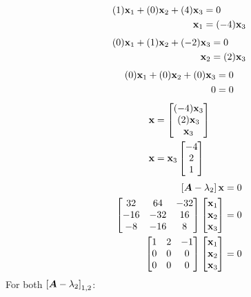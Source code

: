 \documentclass{article}
\begin{document}
\begin{align*}
	(1)\vect{x}_1 + (0)\vect{x}_2 + (4)\vect{x}_3 & = 0 \\
	\vect{x}_1 & = (-4)\vect{x}_3
\end{align*}
\begin{align*}
	(0)\vect{x}_1 + (1)\vect{x}_2 + (-2)\vect{x}_3 & = 0 \\
	\vect{x}_2 & = (2)\vect{x}_3
\end{align*}
\begin{align*}
	(0)\vect{x}_1 + (0)\vect{x}_2 + (0)\vect{x}_3 & = 0 \\
	0 & = 0
\end{align*}
\begin{align*}
	\vect{x} & = \begin{bmatrix} (-4)\vect{x}_3 \\ (2)\vect{x}_3 \\ \vect{x}_3 \end{bmatrix} \\
	\vect{x} & = \vect{x}_3 \begin{bmatrix} -4 \\ 2 \\ 1 \end{bmatrix}
\end{align*}
\begin{align*}
	\left[ \matr{A} - \lambda_2 \right] \vect{x} & =  0 \\
	\begin{bmatrix}
		32 & 64 & -32 \\
		-16 & -32 & 16 \\
		-8 & -16 & 8
	\end{bmatrix}
	\begin{bmatrix} \vect{x}_1 \\ \vect{x}_2 \\ \vect{x}_3 \end{bmatrix} & = 0 \\
	\begin{bmatrix}
		1 & 2 & -1 \\
		0 & 0 &  0 \\
		0 & 0 & 0
	\end{bmatrix}
	\begin{bmatrix} \vect{x}_1 \\ \vect{x}_2 \\ \vect{x}_3 \end{bmatrix} & = 0 \\
\end{align*}
For both $ \left[ \matr{A} - \lambda_2 \right]_{1,2} $:
\end{document}
